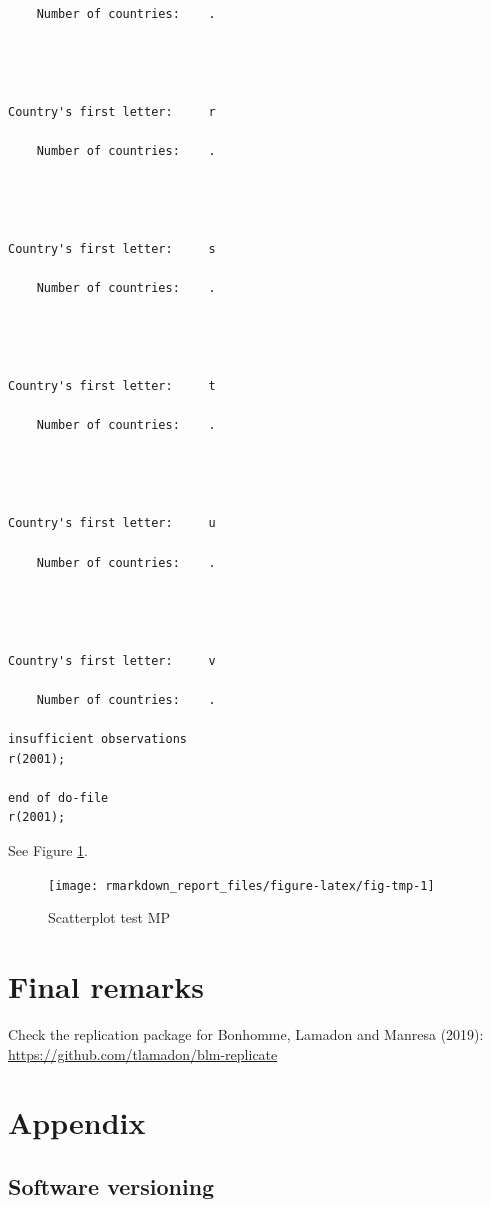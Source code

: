 \documentclass[
  12pt,
]{article}
\begin{document}
\begin{verbatim}
    Number of countries:    .




Country's first letter:     r

    Number of countries:    .




Country's first letter:     s

    Number of countries:    .




Country's first letter:     t

    Number of countries:    .




Country's first letter:     u

    Number of countries:    .




Country's first letter:     v

    Number of countries:    .

insufficient observations
r(2001);

end of do-file
r(2001);
\end{verbatim}

See Figure \ref{fig:fig-tmp}.

\begin{figure}[ht]

{\centering \texttt{[image: rmarkdown\_report\_files/figure-latex/fig-tmp-1]} 

}

\caption{Scatterplot test MP}\label{fig:fig-tmp}
\end{figure}

\hypertarget{final-remarks}{%
\section{Final remarks}\label{final-remarks}}

Check the replication package for Bonhomme, Lamadon and Manresa (2019): \url{https://github.com/tlamadon/blm-replicate}

\newpage

\hypertarget{appendix}{%
\section{Appendix}\label{appendix}}

\hypertarget{software-versioning}{%
\subsection{Software versioning}\label{software-versioning}}
\end{document}
